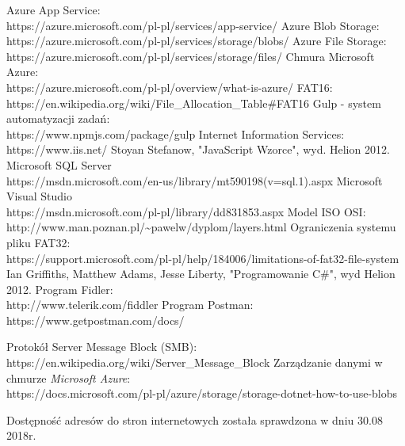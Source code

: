 \begin{thebibliography}{1}
Azure App Service:
\\	
https://azure.microsoft.com/pl-pl/services/app-service/
Azure Blob Storage:
\\
https://azure.microsoft.com/pl-pl/services/storage/blobs/
Azure File Storage:
\\
https://azure.microsoft.com/pl-pl/services/storage/files/
Chmura Microsoft Azure:
\\
https://azure.microsoft.com/pl-pl/overview/what-is-azure/
FAT16:
\\
https://en.wikipedia.org/wiki/File\_Allocation\_Table\#FAT16
Gulp - system automatyzacji zadań:
\\ 
https://www.npmjs.com/package/gulp
 Internet Information Services:
\\
https://www.iis.net/
 Stoyan Stefanow, "JavaScript Wzorce", wyd. Helion 2012.
 Microsoft SQL Server
\\
https://msdn.microsoft.com/en-us/library/mt590198(v=sql.1).aspx
 Microsoft Visual Studio
\\
https://msdn.microsoft.com/pl-pl/library/dd831853.aspx
Model ISO OSI:
\\
http://www.man.poznan.pl/\textasciitilde pawelw/dyplom/layers.html
Ograniczenia systemu pliku FAT32:
\\ https://support.microsoft.com/pl-pl/help/184006/limitations-of-fat32-file-system
 Ian Griffiths, Matthew Adams, Jesse Liberty, "Programowanie C\#", wyd Helion 2012.
Program Fidler:
\\
http://www.telerik.com/fiddler
Program Postman:
\\
https://www.getpostman.com/docs/

Protokół Server Message Block (SMB):
\\
https://en.wikipedia.org/wiki/Server\_Message\_Block
Zarządzanie danymi w chmurze \textit{Microsoft Azure}:
\\
https://docs.microsoft.com/pl-pl/azure/storage/storage-dotnet-how-to-use-blobs
\end{thebibliography}
Dostępność adresów do stron internetowych została sprawdzona w dniu 30.08 2018r.
